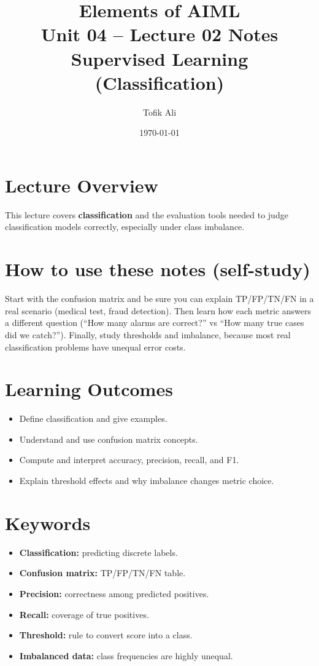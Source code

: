 \documentclass[11pt]{article}
\title{Elements of AIML\\Unit 04 -- Lecture 02 Notes\\Supervised Learning (Classification)}
\author{Tofik Ali}
\date{\today}
\begin{document}
\maketitle
\tableofcontents

\section{Lecture Overview}
This lecture covers \textbf{classification} and the evaluation tools needed to judge classification models correctly, especially under class imbalance.
\notesources{\AIMLUnitIVSources}

\section{How to use these notes (self-study)}
Start with the confusion matrix and be sure you can explain TP/FP/TN/FN in a real scenario (medical test, fraud detection).
Then learn how each metric answers a different question (``How many alarms are correct?'' vs ``How many true cases did we catch?'').
Finally, study thresholds and imbalance, because most real classification problems have unequal error costs.

\section{Learning Outcomes}
\begin{itemize}[leftmargin=*]
  \item Define classification and give examples.
  \item Understand and use confusion matrix concepts.
  \item Compute and interpret accuracy, precision, recall, and F1.
  \item Explain threshold effects and why imbalance changes metric choice.
\end{itemize}

\section{Keywords}
\begin{itemize}[leftmargin=*]
  \item \textbf{Classification:} predicting discrete labels.
  \item \textbf{Confusion matrix:} TP/FP/TN/FN table.
  \item \textbf{Precision:} correctness among predicted positives.
  \item \textbf{Recall:} coverage of true positives.
  \item \textbf{Threshold:} rule to convert score into a class.
  \item \textbf{Imbalanced data:} class frequencies are highly unequal.
\end{itemize}
\end{document}
